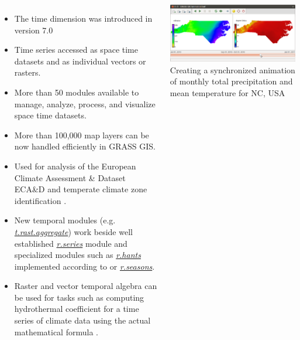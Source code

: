 \documentclass[25pt, margin=0mm, innermargin=25mm, blockverticalspace=25mm, colspace=25mm, subcolspace=8mm]{tikzposter}
\newcommand{\gmodule}[1]{\href{http://grass.osgeo.org/grass74/manuals/#1.html}{\emph{#1}}}
\newcommand{\gamodule}[1]{\href{http://grass.osgeo.org/grass74/manuals/addons/#1.html}{\emph{#1}}}
\begin{document}
\begin{columns}
{\begin{itemize}
 \item The time dimension was introduced in version 7.0 \citep{Gebbert20141, gebbert2015grass}
 \item Time series accessed as space time datasets and as individual vectors or rasters.
 \item More than 50 modules available to manage, analyze, process, and visualize space time datasets.
 \item More than 100,000 map layers can be now handled efficiently in GRASS GIS.
 \item Used for analysis of the European Climate Assessment \& Dataset ECA\&D \citep{Haylock2008_climate_series}
       and temperate climate zone identification \citep{Gebbert20141}.
 \item New temporal modules (e.g. \gmodule{t.rast.aggregate}) work beside well established \gmodule{r.series} module
       and specialized modules such as \gamodule{r.hants} implemented according to \cite{roerink2000reconstructing} or \gamodule{r.seasons}.
 \item Raster and vector temporal algebra can be used for tasks
       such as computing hydrothermal coefficient for a time series of climate data using the actual mathematical formula
       \citep{leppelt2015grass}.
\end{itemize}

\vspace*{1.5cm}

\begin{minipage}{\linewidth}
\centering
\includegraphics[width=.7\linewidth]{images/temporal_precip_temp}
\\
Creating a synchronized animation of monthly total precipitation and mean temperature for NC, USA
\end{minipage}

\vspace*{1cm}

}






\end{columns}
\end{document}

